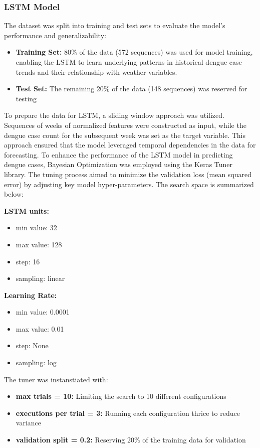 \subsubsection{LSTM Model}
The dataset was split into training and test sets to evaluate the model’s performance and generalizability:
\begin{itemize}
	\item \textbf{Training Set:} 80\% of the data (572 sequences) was used for model training, enabling the LSTM to learn underlying patterns in historical dengue case trends and their relationship with weather variables.
	\item \textbf{Test Set:} The remaining 20\% of the data (148 sequences) was reserved for testing
\end{itemize}

To prepare the data for LSTM, a sliding window approach was utilized. Sequences of weeks of normalized features were constructed as input, while the dengue case count for the subsequent week was set as the target variable. This approach ensured that the model leveraged temporal dependencies in the data for forecasting. To enhance the performance of the LSTM model in predicting dengue cases, Bayesian Optimization was employed using the Keras Tuner library. The tuning process aimed to minimize the validation loss (mean squared error) by adjusting key model hyper-parameters. The search space is summarized below:

\textbf{LSTM units:}
\begin{itemize}
	\item  min value: 32 
	\item	max value: 128
	\item	step: 16
	\item	sampling: linear
\end{itemize}
\textbf{Learning Rate:}
\begin{itemize}
	\item  min value: 0.0001 
	\item	max value: 0.01
	\item	step: None
	\item	sampling: log
\end{itemize}



The tuner was instanstiated with:
\begin{itemize}
	\item \textbf{max trials = 10:} Limiting the search to 10 different configurations
	\item \textbf{executions per trial = 3:} Running each configuration thrice to reduce variance
	\item \textbf{validation split = 0.2:} Reserving 20\% of the training data for validation
\end{itemize}

